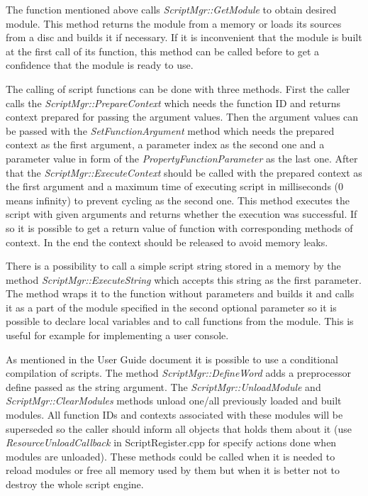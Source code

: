 \documentclass[a4paper, 12pt]{report}
\begin{document}
The function mentioned above calls \emph{ScriptMgr::GetModule} to obtain desired module. This method returns the module from a memory or loads its sources from a disc and builds it if necessary. If it is inconvenient that the module is built at the first call of its function, this method can be called before to get a confidence that the module is ready to use.

The calling of script functions can be done with three methods. First the caller calls the \emph{ScriptMgr::PrepareContext} which needs the function ID and returns context prepared for passing the argument values. Then the argument values can be passed with the \emph{SetFunctionArgument} method which needs the prepared context as the first argument, a parameter index as the second one and a parameter value in form of the \emph{PropertyFunctionParameter} as the last one. After that the \emph{ScriptMgr::ExecuteContext} should be called with the prepared context as the first argument and a maximum time of executing script in milliseconds (0 means infinity) to prevent cycling as the second one. This method executes the script with given arguments and returns whether the execution was successful. If so it is possible to get a return value of function with corresponding methods of context. In the end the context should be released to avoid memory leaks.

There is a possibility to call a simple script string stored in a memory by the method \emph{ScriptMgr::ExecuteString} which accepts this string as the first parameter. The method wraps it to the function without parameters and builds it and calls it as a part of the module specified in the second optional parameter so it is possible to declare local variables and to call functions from the module. This is useful for example for implementing a user console.

As mentioned in the User Guide document
it is possible to use a conditional compilation of scripts. The method \emph{ScriptMgr::DefineWord} adds a preprocessor define passed as the string argument. The \emph{ScriptMgr::\-Unload\-Module} and \emph{ScriptMgr::ClearModules} methods unload one/all previously loaded and built modules. All function IDs and contexts associated with these modules will be superseded so the caller should inform all objects that holds them about it (use \emph{ResourceUnloadCallback} in ScriptRegister.cpp for specify actions done when modules are unloaded). These methods could be called when it is needed to reload modules or free all memory used by them but when it is better not to destroy the whole script engine.
\end{document}
